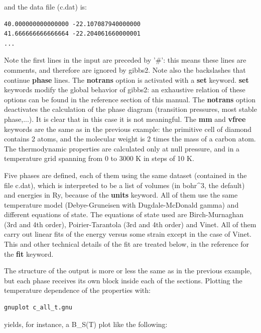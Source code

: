 \documentclass[a4paper]{article}
\begin{document}
and the data file (c.dat) is:
%
\asciilist
\begin{lstlisting}
40.000000000000000 -22.107087940000000
41.666666666666664 -22.204061660000001
...
\end{lstlisting}

Note the first lines in the input are preceded by '\#': this means
these lines are comments, and therefore are ignored by gibbs2. Note
also the backslashes that continue \textbf{phase} lines. The \textbf{notrans}
option is activated with a \textbf{set} keyword. \textbf{set} keywords modify
the global behavior of gibbs2: an exhaustive relation of these options
can be found in the reference section of this manual. The \textbf{notrans}
option deactivates the calculation of the phase diagram (transition
pressures, most stable phase,...). It is clear that in this case it is
not meaningful. The \textbf{mm} and \textbf{vfree} keywords are the same as in
the previous example: the primitive cell of diamond contains 2 atoms,
and the molecular weight is 2 times the mass of a carbon atom. The
thermodynamic properties are calculated only at null pressure, and in
a temperature grid spanning from 0 to 3000 K in steps of 10 K.

Five phases are defined, each of them using the same dataset
(contained in the file c.dat), which is interpreted to be a list of
volumes (in bohr\textasciicircum{}3, the default) and energies in Ry, because of the
\textbf{units} keyword. All of them use the same temperature model
(Debye-Gruneisen with Dugdale-McDonald gamma) and different equations
of state. The equations of state used are Birch-Murnaghan (3rd and 4th
order), Poirier-Tarantola (3rd and 4th order) and Vinet. All of them
carry out linear fits of the energy versus some strain except in the
case of Vinet. This and other technical details of the fit are treated
below, in the reference for the \textbf{fit} keyword.

The structure of the output is more or less the same as in the
previous example, but each phase receives its own block inside each of
the sections. Plotting the temperature dependence of the properties
with:
%
\asciilist
\begin{lstlisting}
gnuplot c_all_t.gnu
\end{lstlisting}

yields, for instance, a B\_S(T) plot like the following:
\end{document}
